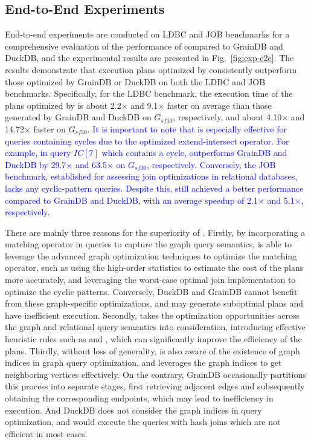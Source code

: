 \subsection{End-to-End Experiments}
\label{sec:experiment-e2e}

End-to-end experiments are conducted on LDBC and JOB benchmarks for a comprehensive evaluation of the performance of \name compared to GrainDB and DuckDB,
and the experimental results are presented in Fig.~\ref{fig:exp-e2e}.
The results demonstrate that execution plans optimized by \name consistently outperform those optimized by GrainDB or DuckDB on both the LDBC and JOB benchmarks.
Specifically, for the LDBC benchmark, the execution time of the plans optimized by \name is about 2.2$\times$ and 9.1$\times$ faster on average than those generated by GrainDB and DuckDB on $G_{sf10}$, respectively, and about 4.10$\times$ and 14.72$\times$ faster on $G_{sf30}$.
\textcolor{blue}{
It is important to note that \name is especially effective for queries containing cycles due to the optimized extend-intersect operator. 
For example, in query $IC[7]$ which contains a cycle, \name outperforms GrainDB and DuckDB by 29.7$\times$ and 63.5$\times$ on $G_{sf30}$, respectively.
Conversely, the JOB benchmark, established for assessing join optimizations in relational databases, lacks any cyclic-pattern queries. Despite this, \name still achieved a better performance compared to GrainDB and DuckDB, with an average speedup of 2.1$\times$ and 5.1$\times$, respectively.
}

There are mainly three reasons for the superiority of \name.
Firstly, by incorporating a matching operator in \spjm queries to capture the graph query semantics, \name is able to leverage the advanced graph optimization techniques to optimize the matching operator, such as using the high-order statistics to estimate the cost of the plans more accurately, and leveraging the worst-case optimal join implementation to optimize the cyclic patterns.
Conversely, DuckDB and GrainDB cannot benefit from these graph-specific optimizations, and may generate suboptimal plans and have inefficient execution.
Secondly, \name takes the optimization opportunities across the graph and relational query semantics into consideration, introducing effective heuristic rules such as \filterrule and \joinfuserule, which can significantly improve the efficiency of the plans.
Thirdly, without loss of generality, \name is also aware of the existence of graph indices in graph query optimization, and leverages the graph indices to get neighboring vertices effectively.
On the contrary, GrainDB occasionally partitions this process into separate stages, first retrieving adjacent edges and subsequently obtaining the corresponding endpoints, which may lead to inefficiency in execution. And DuckDB does not consider the graph indices in query optimization, and would execute the queries with hash joins which are not efficient in most cases.

